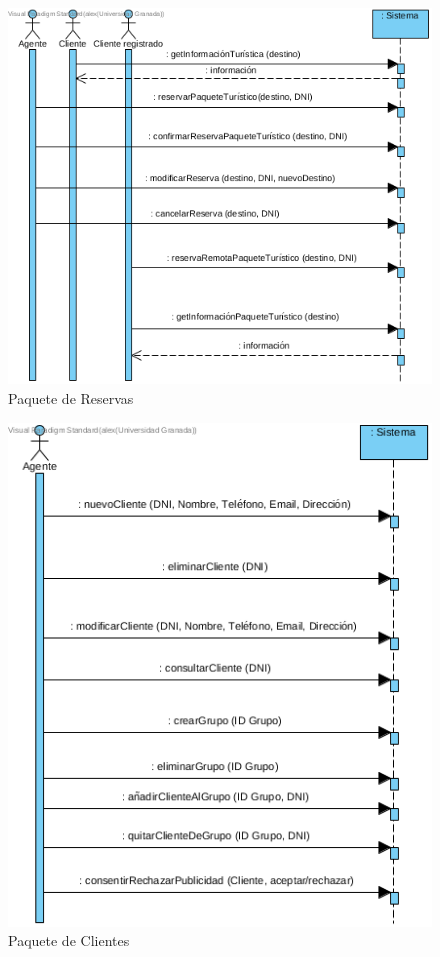 \documentclass{article}
\begin{document}
	\begin{figure}[H]
		\centering
		\includegraphics[totalheight=12cm]{Reservas}
		\caption{Paquete de Reservas}
		\label{fig:p2}
	\end{figure}

	\begin{figure}[H]
		\centering
		\includegraphics[totalheight=12cm]{Clientes}
		\caption{Paquete de Clientes}
		\label{fig:p3}
	\end{figure}
\end{document}
